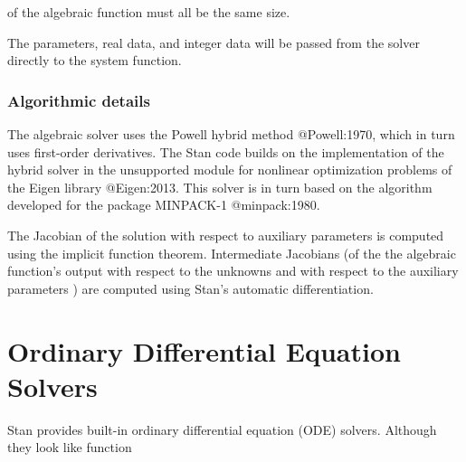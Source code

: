 \begin{description}
\begin{description}
\begin{description}
\begin{description}
\begin{description}
\begin{description}
\begin{description}
\begin{description}
\begin{description}
\begin{description}
\begin{description}
\begin{description}
\begin{description}
\begin{description}
\begin{description}
\begin{description}
\begin{description}
\begin{description}
\begin{description}
\begin{description}
\begin{description}
\begin{description}
\begin{description}
\begin{description}
\begin{description}
\begin{description}
\begin{description}
\begin{description}
\begin{description}
\begin{description}
\begin{description}
\begin{description}
\begin{description}
\begin{description}
\begin{description}
\begin{description}
\begin{description}
\begin{description}
\begin{description}
\begin{description}
\begin{description}
\begin{description}
\begin{description}
\begin{description}
\begin{description}
\begin{description}
\begin{description}
\begin{description}
\begin{description}
\begin{description}
\begin{description}
\begin{description}
\begin{description}
\begin{description}
\begin{description}
\begin{description}
\begin{description}
\begin{description}
\begin{description}
\begin{description}
\begin{description}
\begin{description}
\begin{description}
\begin{description}
\begin{description}
\begin{description}
\begin{description}
\begin{description}
\begin{description}
\begin{description}
\begin{description}
\begin{description}
\begin{description}
\begin{description}
\begin{description}
\begin{description}
\begin{description}
\begin{description}
\begin{description}
\begin{description}
\begin{description}
\begin{description}
of the algebraic function must all be the same size.

The parameters, real data, and integer data will be passed from the solver directly to the system function.

\subsubsection{Algorithmic details}

The algebraic solver uses the Powell hybrid method @Powell:1970, which in turn uses first-order derivatives. The Stan code builds on the implementation of the hybrid solver in the unsupported module for nonlinear optimization problems of the Eigen library @Eigen:2013. This solver is in turn based on the algorithm developed for the package MINPACK-1 @minpack:1980.

The Jacobian of the solution with respect to auxiliary parameters is computed using the implicit function theorem. Intermediate Jacobians (of the the algebraic function's output with respect to the unknowns  and with respect to the auxiliary parameters ) are computed using Stan's automatic differentiation.

\section{Ordinary Differential Equation Solvers}

Stan provides built-in ordinary differential equation (ODE) solvers. Although they look like function 
\end{description}
\end{description}
\end{description}
\end{description}
\end{description}
\end{description}
\end{description}
\end{description}
\end{description}
\end{description}
\end{description}
\end{description}
\end{description}
\end{description}
\end{description}
\end{description}
\end{description}
\end{description}
\end{description}
\end{description}
\end{description}
\end{description}
\end{description}
\end{description}
\end{description}
\end{description}
\end{description}
\end{description}
\end{description}
\end{description}
\end{description}
\end{description}
\end{description}
\end{description}
\end{description}
\end{description}
\end{description}
\end{description}
\end{description}
\end{description}
\end{description}
\end{description}
\end{description}
\end{description}
\end{description}
\end{description}
\end{description}
\end{description}
\end{description}
\end{description}
\end{description}
\end{description}
\end{description}
\end{description}
\end{description}
\end{description}
\end{description}
\end{description}
\end{description}
\end{description}
\end{description}
\end{description}
\end{description}
\end{description}
\end{description}
\end{description}
\end{description}
\end{description}
\end{description}
\end{description}
\end{description}
\end{description}
\end{description}
\end{description}
\end{description}
\end{description}
\end{description}
\end{description}
\end{description}
\end{description}
\end{description}
\end{description}

